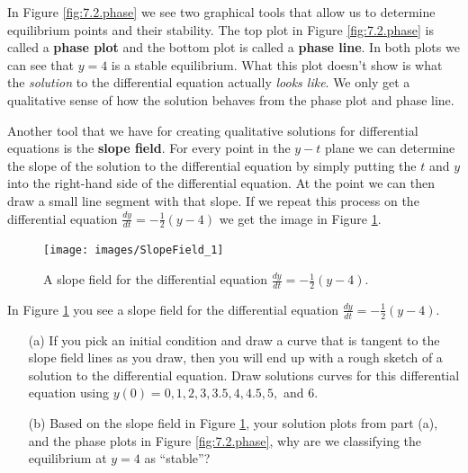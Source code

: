 In Figure \ref{fig:7.2.phase} we see two graphical tools that allow us to determine
equilibrium points and their stability.  The top plot in Figure \ref{fig:7.2.phase} is
called a {\bf phase plot} and the bottom plot is called a {\bf phase line}.  In both plots
we can see that $y=4$ is a stable equilibrium.  What this plot doesn't show is what the
{\it solution} to the differential equation actually {\it looks like}.  We only get a
qualitative sense of how the solution behaves from the phase plot and phase line.

Another tool that we have for creating qualitative solutions for differential equations is
the {\bf slope field}.  For every point in the $y-t$ plane we can determine the slope of
the solution to the differential equation by simply putting the $t$ and $y$ into the
right-hand side of the differential equation.  At the point we can then draw a small line
segment with that slope.  If we repeat this process on the differential equation
$\frac{dy}{dt} = -\frac{1}{2} (y-4)$ we get the image in Figure \ref{fig:slope_field_1}.

\begin{figure}[ht!]
    \centering
    \texttt{[image: images/SlopeField\_1]}
    \caption{A slope field for the differential equation $\frac{dy}{dt} =
    -\frac{1}{2}(y-4)$. }
    \label{fig:slope_field_1}
\end{figure}

\begin{problem}
    In Figure \ref{fig:slope_field_1} you see a slope field for the differential equation
    $\frac{dy}{dt} = -\frac{1}{2} (y-4)$.  
    \begin{enumerate}
        \item[(a)] If you pick an initial condition and draw a
            curve that is tangent to the slope field lines as you draw, then you will end up with
            a rough sketch of a solution to the differential equation.  Draw solutions curves for
            this differential equation using $y(0) = 0, 1, 2, 3, 3.5, 4, 4.5, 5,$ and $6$. 
        \item[(b)] Based on the slope field in Figure \ref{fig:slope_field_1}, your solution plots
            from part (a), and the phase plots in Figure \ref{fig:7.2.phase}, why are we
            classifying the equilibrium at $y=4$ as ``stable''?
    \end{enumerate}
\end{problem}

